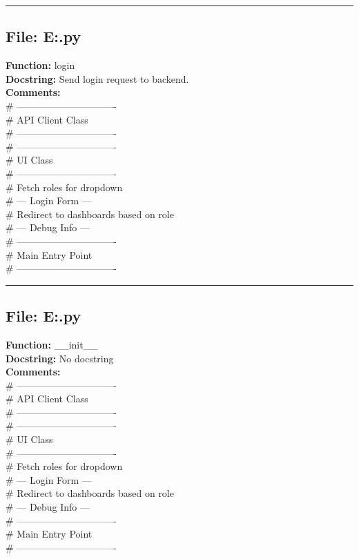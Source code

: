 {\hrule

\subsection*{File: E:\project\capstone\frontend\login.py}
\textbf{Function:} login\\
\textbf{Docstring:} Send login request to backend.\\
\textbf{Comments:}\\
# -------------------------------\\
# API Client Class\\
# -------------------------------\\
# -------------------------------\\
# UI Class\\
# -------------------------------\\
# Fetch roles for dropdown\\
# --- Login Form ---\\
# Redirect to dashboards based on role\\
# --- Debug Info ---\\
# -------------------------------\\
# Main Entry Point\\
# -------------------------------\\

\hrule

\subsection*{File: E:\project\capstone\frontend\login.py}
\textbf{Function:} __init__\\
\textbf{Docstring:} No docstring\\
\textbf{Comments:}\\
# -------------------------------\\
# API Client Class\\
# -------------------------------\\
# -------------------------------\\
# UI Class\\
# -------------------------------\\
# Fetch roles for dropdown\\
# --- Login Form ---\\
# Redirect to dashboards based on role\\
# --- Debug Info ---\\
# -------------------------------\\
# Main Entry Point\\
# -------------------------------\\

}
